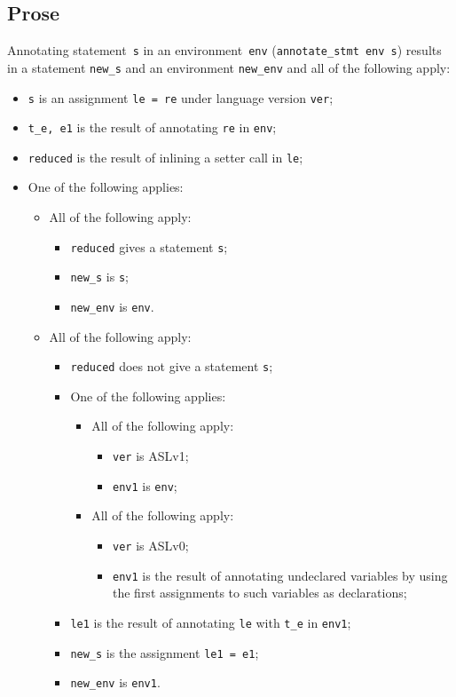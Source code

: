 \documentclass{book}
\begin{document}
  \subsection{Prose}
Annotating statement~\texttt{s} in an environment~\texttt{env}
(\texttt{annotate\_stmt env s}) results in a statement \texttt{new\_s} and an
environment \texttt{new\_env} and all of the following apply:
   \begin{itemize}
   \item \texttt{s} is an assignment \texttt{le = re} under language version \texttt{ver};
   \item \texttt{t\_e, e1} is the result of annotating \texttt{re} in \texttt{env};
   \item \texttt{reduced} is the result of inlining a setter call in \texttt{le};
   \item One of the following applies:
     \begin{itemize}
     \item All of the following apply:
       \begin{itemize}
       \item \texttt{reduced} gives a statement \texttt{s};
       \item \texttt{new\_s} is \texttt{s};
       \item \texttt{new\_env} is \texttt{env}.
       \end{itemize}

     \item All of the following apply:
       \begin{itemize}
       \item \texttt{reduced} does not give a statement \texttt{s};
       \item One of the following applies:
         \begin{itemize}
         \item All of the following apply:
           \begin{itemize}
           \item \texttt{ver} is ASLv1;
           \item \texttt{env1} is \texttt{env};
           \end{itemize}
         \item All of the following apply:
           \begin{itemize}
           \item \texttt{ver} is ASLv0;
	   \item \texttt{env1} is the result of annotating undeclared variables by using
	      the first assignments to such variables as declarations;
           \end{itemize}
         \end{itemize}

       \item \texttt{le1} is the result of annotating \texttt{le} with \texttt{t\_e} in \texttt{env1};
       \item \texttt{new\_s} is the assignment \texttt{le1 = e1};
       \item \texttt{new\_env} is \texttt{env1}.
       \end{itemize}
    \end{itemize}
  \end{itemize}
\end{document}
